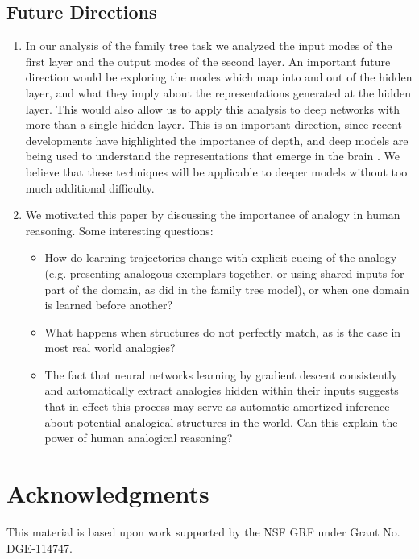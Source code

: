 \documentclass[10pt,letterpaper]{article}
\begin{document}
\subsection{Future Directions}
\begin{enumerate}
\itemsep0em
\item In our analysis of the family tree task we analyzed the input modes of the first layer and the output modes of the second layer. An important future direction would be exploring the modes which map into and out of the hidden layer, and what they imply about the representations generated at the hidden layer. This would also allow us to apply this analysis to deep networks with more than a single hidden layer. This is an important direction, since recent developments have highlighted the importance of depth, and deep models are being used to understand the representations that emerge in the brain \citep[e.g.]{Yamins2016a}. We believe that these techniques will be applicable to deeper models without too much additional difficulty. 
\item We motivated this paper by discussing the importance of analogy in human reasoning. Some interesting questions:
\begin{itemize}
\itemsep0em
\item How do learning trajectories change with explicit cueing of the analogy (e.g. presenting analogous exemplars together, or using shared inputs for part of the domain, as \citet{Hinton1986} did in the family tree model), or when one domain is learned before another?
\item What happens when structures do not perfectly match, as is the case in most real world analogies?
\item The fact that neural networks learning by gradient descent consistently and automatically extract analogies hidden within their inputs suggests that in effect this process may serve as automatic amortized inference about potential analogical structures in the world. Can this explain the power of human analogical reasoning?  
\end{itemize}
\end{enumerate}
\section{Acknowledgments}
This material is based upon work supported by the NSF GRF under Grant No. DGE-114747.


\setlength{\bibleftmargin}{.125in}
\setlength{\bibindent}{-\bibleftmargin}


\end{document}
